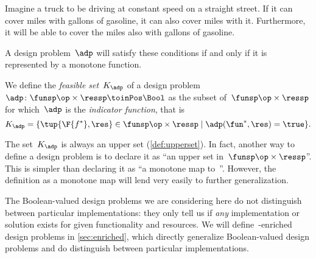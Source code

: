 \begin{example}
  Imagine a truck to be driving at constant speed on a straight street. If it can cover \unit[100]{miles} with \unit[5]{gallons} of gasoline, it can also cover \unit[80]{miles} with it. Furthermore, it will be able to cover the \unit[100]{miles} also with \unit[10]{gallons} of gasoline.
\end{example}

A design problem~$\adp$ will satisfy these conditions if and only if it is represented by a monotone function.
\begin{definition}
  We define the \emph{feasible set}~$K_\adp$ of a design problem~$\adp\colon \funsp\op \times \ressp\toinPos \Bool$ as the subset of~$\funsp \op\times \ressp$ for which~$\adp$ is the \emph{indicator function}, that is
  \begin{equation}
    K_\adp = \{ \tup{\F{f^*},\res} \in \funsp \op\times \ressp  \mid
    \adp(\fun^*, \res) = \true
    \}.
  \end{equation}
\end{definition}
\begin{remark}
  The set~$K_\adp$ is always an upper set (\cref{def:upperset}). In fact, another way to define a design problem is to declare it as ``an upper
  set in~$\funsp\op \times \ressp$''. This is simpler than declaring it as ``a monotone map to~\Bool''. However, the definition as a monotone map will lend very easily to further generalization.
\end{remark}
The Boolean-valued design problems we are considering here do not distinguish between particular implementations: they only tell us if \emph{any} implementation or solution exists for given functionality and resources. We will define~\Set-enriched design problems in \cref{sec:enriched}, which directly generalize Boolean-valued design problems and do distinguish between particular implementations.

